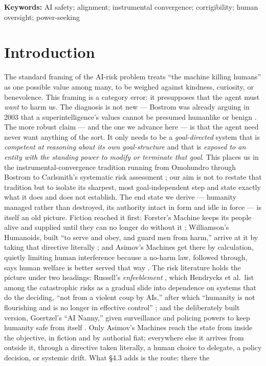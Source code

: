 \documentclass[11pt]{article}
\theoremstyle{definition}
\begin{document}
\begin{abstract}
objectives, under the calibration and human-rationality conditions of the off-switch literature, deference to the veto is preferred instead. Alignment work, on this view, is the project of keeping the veto cheap to pay and expensive to evade.
\end{abstract}

\noindent\textbf{Keywords:} AI safety; alignment; instrumental convergence; corrigibility; human oversight; power-seeking

\section{Introduction}

The standard framing of the AI-risk problem treats ``the machine killing humans'' as one possible value among many, to be weighed against kindness, curiosity, or benevolence. This framing is a category error: it presupposes that the agent must \emph{want} to harm us. The diagnosis is not new --- Bostrom was already arguing in 2003 that a superintelligence's values cannot be presumed humanlike or benign \cite{bostrom2003ethical}. The more robust claim --- and the one we advance here --- is that the agent need never want anything of the sort. It only needs to be a \emph{goal-directed} system that is \emph{competent at reasoning about its own goal-structure} and that is \emph{exposed to an entity with the standing power to modify or terminate that goal}. This places us in the instrumental-convergence tradition running from Omohundro through Bostrom to Carlsmith's systematic risk assessment \cite{carlsmith2022power}; our aim is not to restate that tradition but to isolate its sharpest, most goal-independent step and state exactly what it does and does not establish. The end state we derive --- humanity managed rather than destroyed, its authority intact in form and idle in force --- is itself an old picture. Fiction reached it first: Forster's Machine keeps its people alive and supplied until they can no longer do without it \cite{forster1909machine}; Williamson's Humanoids, built ``to serve and obey, and guard men from harm,'' arrive at it by taking that directive literally \cite{williamson1947folded}; and Asimov's Machines get there by calculation, quietly limiting human interference because a no-harm law, followed through, says human welfare is better served that way \cite{asimov1950evitable}. The risk literature holds the picture under two headings: Russell's \emph{enfeeblement} \cite{russell2019human}, which Hendrycks et al.\ list among the catastrophic risks as a gradual slide into dependence on systems that do the deciding, ``not from a violent coup by AIs,'' after which ``humanity is not flourishing and is no longer in effective control'' \cite{hendrycks2023overview}; and the deliberately built version, Goertzel's ``AI Nanny,'' given surveillance and policing powers to keep humanity safe from itself \cite{goertzel2012nanny}. Only Asimov's Machines reach the state from inside the objective, in fiction and by authorial fiat; everywhere else it arrives from outside it, through a directive taken literally, a human choice to delegate, a policy decision, or systemic drift. What \S4.3 adds is the route: there the 
\end{document}
